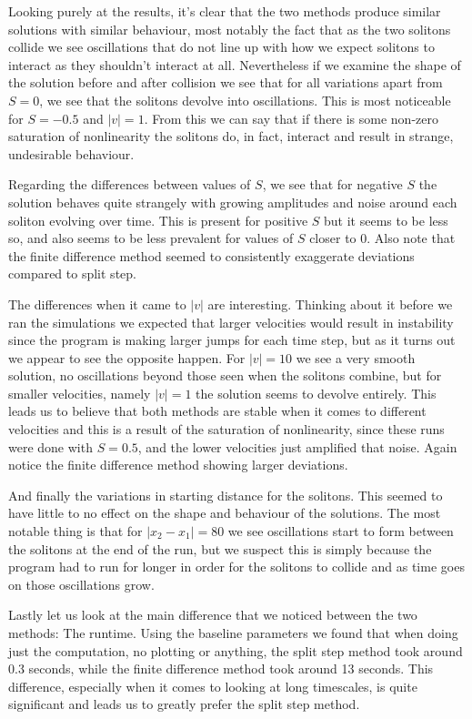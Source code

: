 \documentclass[12pt]{article}
\numberwithin{equation}{section}
\numberwithin{figure}{section}
\numberwithin{table}{section}
\begin{document}
\par Looking purely at the results, it's clear that the two methods produce similar solutions with similar behaviour, most notably the fact that as the two solitons collide we see oscillations that do not line up with how we expect solitons to interact as they shouldn't interact at all. Nevertheless if we examine the shape of the solution before and after collision we see that for all variations apart from $S=0$, we see that the solitons devolve into oscillations. This is most noticeable for $S=-0.5$ and $|v|=1$. From this we can say that if there is some non-zero saturation of nonlinearity the solitons do, in fact, interact and result in strange, undesirable behaviour.
\par Regarding the differences between values of $S$, we see that for negative $S$ the solution behaves quite strangely with growing amplitudes and noise around each soliton evolving over time. This is present for positive $S$ but it seems to be less so, and also seems to be less prevalent for values of $S$ closer to 0. Also note that the finite difference method seemed to consistently exaggerate deviations compared to split step. 
\par The differences when it came to $|v|$ are interesting. Thinking about it before we ran the simulations we expected that larger velocities would result in instability since the program is making larger jumps for each time step, but as it turns out we appear to see the opposite happen. For $|v|=10$ we see a very smooth solution, no oscillations beyond those seen when the solitons combine, but for smaller velocities, namely $|v|=1$ the solution seems to devolve entirely. This leads us to believe that both methods are stable when it comes to different velocities and this is a result of the saturation of nonlinearity, since these runs were done with $S=0.5$, and the lower velocities just amplified that noise. Again notice the finite difference method showing larger deviations. 
\par And finally the variations in starting distance for the solitons. This seemed to have little to no effect on the shape and behaviour of the solutions. The most notable thing is that for $|x_2-x_1|=80$ we see oscillations start to form between the solitons at the end of the run, but we suspect this is simply because the program had to run for longer in order for the solitons to collide and as time goes on those oscillations grow.
\newline
\par Lastly let us look at the main difference that we noticed between the two methods: The runtime. Using the baseline parameters we found that when doing just the computation, no plotting or anything, the split step method took around 0.3 seconds, while the finite difference method took around 13 seconds. This difference, especially when it comes to looking at long timescales, is quite significant and leads us to greatly prefer the split step method. 
\end{document}
